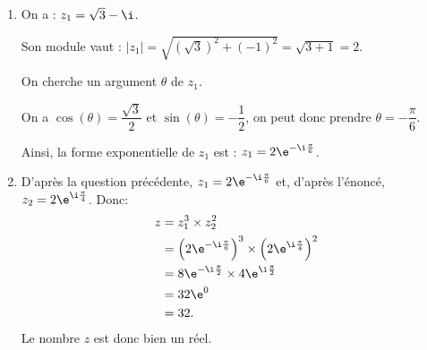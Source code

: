 \medskip

\begin{enumerate}
\item  On a : $z_1 = \sqrt{3} - \i$.

Son module vaut : $|z_1|=\sqrt{(\sqrt{3})^2+(-1)^2}=\sqrt{3+1}=2$.

On cherche un argument $\theta$ de $z_1$.

On a $\cos(\theta)=\dfrac{\sqrt{3}}{2}$ et $\sin(\theta)=-\dfrac{1}{2}$, on peut donc prendre $\theta=-\dfrac{\pi}{6}$.

Ainsi, la forme exponentielle de $z_1$ est : $z_1=2\e^{-\i\frac{\pi}{6}}$.

\item D'après la question précédente, $z_1=2\e^{-\i\frac{\pi}{6}}$ et, d'après l'énoncé, $z_2=2\e^{\i\frac{\pi}{4}}$. Donc:
\[
\begin{aligned}
z&=z_1^3\times z_2^2\\
&=\left(2\e^{-\i\frac{\pi}{6}}\right)^3\times\left(2\e^{\i\frac{\pi}{4}}\right)^2\\
&=8\e^{-\i\frac{\pi}{2}}\times 4\e^{\i\frac{\pi}{2}}\\
&=32\e^0\\
&=32.
\end{aligned}
\]
Le nombre $z$ est donc bien un réel.
\end{enumerate}

\bigskip
